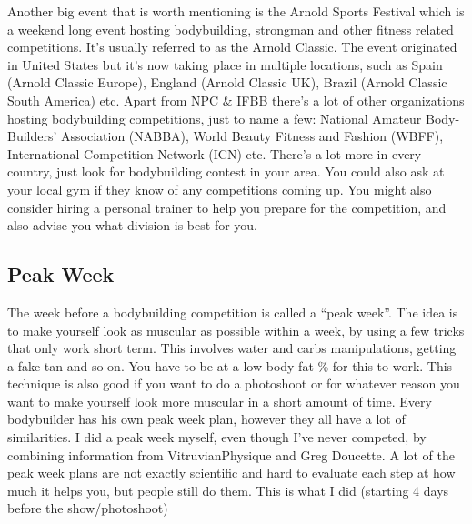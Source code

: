 \documentclass[openany, 12pt]{book}
\begin{document}
        Another big event that is worth mentioning is the Arnold Sports Festival which is a weekend long event hosting bodybuilding, strongman and other fitness
        related competitions. It's usually referred to as the Arnold Classic. The event originated in United States but it's now taking place in multiple locations, such as Spain (Arnold Classic
        Europe), England (Arnold Classic UK), Brazil (Arnold Classic South America) etc. Apart from NPC \& IFBB there's a lot of other organizations hosting bodybuilding competitions, just to name
        a few: National Amateur Body-Builders' Association (NABBA), World Beauty Fitness and Fashion (WBFF), International Competition Network (ICN) etc.
        There's a lot more in every country, just look for bodybuilding contest in your area. You could also ask at your local
        gym if they know of any competitions coming up. You might also consider hiring a personal trainer to help you prepare for the competition, and also advise you what division is best for you.

        \subsection{Peak Week}

        The week before a bodybuilding competition is called a ``peak week''. The idea is to make yourself look as muscular as possible within a week,
        by using a few tricks that only work short term. This involves water and carbs manipulations, getting a fake tan and so on. You have to be at a low body fat \% for this to work.
        This technique is also good if you want to do a photoshoot or for whatever reason you want to make yourself look more muscular in a short amount of time. Every bodybuilder has his own peak week
        plan, however they all have a lot of similarities. I did a peak week myself, even though I've never competed, by combining information from VitruvianPhysique and Greg Doucette.
        A lot of the peak week plans are not exactly scientific and hard to evaluate each step at how much
        it helps you, but people still do them. This is what I did (starting 4 days before the show/photoshoot)
        
\end{document}
